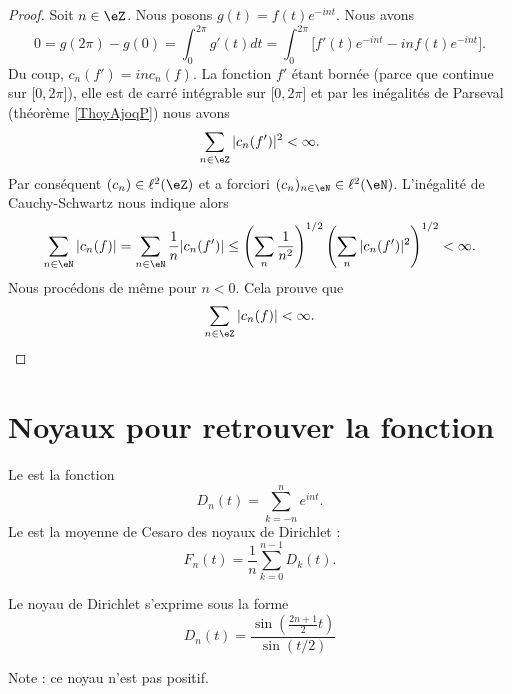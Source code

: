 \begin{proof}
    Soit \( n\in \eZ\). Nous posons \( g(t)=f(t) e^{-int}\). Nous avons
    \begin{equation}
        0=g(2\pi)-g(0)=\int_0^{2\pi}g'(t)dt=\int_0^{2\pi}\big[ f'(t) e^{-int}-inf(t) e^{-int} \big].
    \end{equation}
    Du coup, \( c_n(f')=inc_n(f)\). La fonction \( f'\) étant bornée (parce que continue sur \( \mathopen[ 0 , 2\pi \mathclose]\)), elle est de carré intégrable sur \( \mathopen[ 0 , 2\pi \mathclose]\) et par les inégalités de Parseval (théorème \ref{ThoyAjoqP}) nous avons
    \begin{equation}
        \sum_{n\in \eZ}| c_n(f') |^2<\infty.
    \end{equation}
    Par conséquent \( (c_n)\in \ell^2(\eZ)\) et a forciori \( (c_n)_{n\in \eN}\in \ell^2(\eN)\). L'inégalité de Cauchy-Schwartz nous indique alors
    \begin{equation}
        \sum_{n\in \eN}| c_n(f) |=\sum_{n\in \eN}\frac{1}{ n }| c_n(f') |\leq \left( \sum_n\frac{1}{ n^2 } \right)^{1/2}\left( \sum_{n}| c_n(f') |^2 \right)^{1/2}<\infty.
    \end{equation}
    Nous procédons de même pour \( n<0\). Cela prouve que 
    \begin{equation}
        \sum_{n\in \eZ}| c_n(f) |<\infty.
    \end{equation}
\end{proof}

\section{Noyaux pour retrouver la fonction}

Le  est la fonction
\begin{equation}
    D_n(t)=\sum_{k=-n}^n e^{int}.
\end{equation}
Le  est la moyenne de Cesaro des noyaux de Dirichlet :
\begin{equation}
    F_n(t)=\frac{1}{ n }\sum_{k=0}^{n-1}D_k(t).
\end{equation}

\begin{lemma}
    Le noyau de Dirichlet s'exprime sous la forme
    \begin{equation}    
        D_n(t)=\frac{ \sin\left( \frac{ 2n+1 }{ 2 }t \right) }{ \sin(t/2) }
    \end{equation}
\end{lemma}
Note : ce noyau n'est pas positif.

